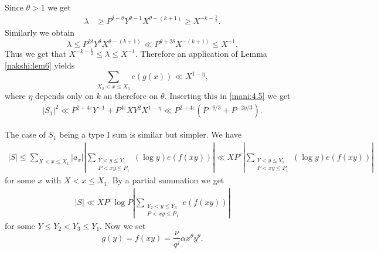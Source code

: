 \documentclass[a4paper,10pt]{amsart}
\numberwithin{equation}{section}
\theoremstyle{definition}
\theoremstyle{remark}
\renewcommand{\lvert}{\left\vert}
\renewcommand{\rvert}{\right\vert}
\begin{document}

Since $\theta>1$ we get
\begin{align*}
\lambda&\geq P^{\delta-\theta}Y^{\theta-1}X^{\theta-(k+1)}\geq X^{-k-\frac12}.
\end{align*}
Similarly we obtain
\[
\lambda
\leq P^{2\delta}Y^{\theta}X^{\theta-(k+1)}
\ll P^{\theta+2\delta}X^{-(k+1)}
\leq X^{-1}.
\]
Thus we get that $X^{-k-\frac12}\leq\lambda\leq X^{-1}$. Therefore an application of Lemma \ref{nakshi:lem6} yields
\[
\sum_{X_2<x\leq X_3}e(g(x))\ll X^{1-\eta},
\]
where $\eta$ depends only on $k$ an therefore on $\theta$. Inserting this in 
\eqref{mani:4.5} we get
\begin{gather}\label{mani:res:typeII}
\lvert S_1\rvert^2\ll P^{2+4\varepsilon}Y^{-1}+P^{4\varepsilon}XY^2X^{1-\eta}
\ll P^{2+4\varepsilon}\left(P^{-\delta/3}+P^{-2\eta/3}\right).
\end{gather}

The case of $S_1$ being a type I sum is similar but simpler. We have
\begin{align*}
\lvert S\rvert
\leq\sum_{X<x\leq X_1}\lvert a_x\rvert
  \lvert\sum_{\substack{Y<y\leq Y_1\\P<xy\leq P_1}}(\log y)e\left(f(xy)\right)\rvert
\ll XP^{\varepsilon}\lvert\sum_{\substack{Y<y\leq Y_1\\P<xy\leq P_1}}(\log y)e\left(f(xy)\right)\rvert
\end{align*}
for some $x$ with $X<x\leq X_1$. By a partial summation we get
\begin{gather}\label{mani:6}
  \lvert S\rvert\ll XP^\varepsilon\log P\lvert\sum_{\substack{Y_2<y\leq
      Y_3\\P<xy\leq P_1}}e\left(f(xy)\right)\rvert
\end{gather}
for some $Y\leq Y_2<Y_3\leq Y_1$. Now we set
\[
g(y)
=f(xy)
=\frac{\nu}{q^{j}}\alpha x^\theta y^\theta.
\]
\end{document}
